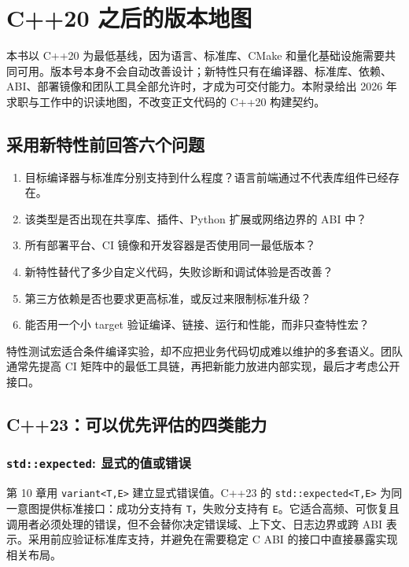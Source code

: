 \chapter{C++20 之后的版本地图}

本书以 C++20 为最低基线，因为语言、标准库、CMake 和量化基础设施需要共同可用。版本号本身不会自动改善设计；新特性只有在编译器、标准库、依赖、ABI、部署镜像和团队工具全部允许时，才成为可交付能力。本附录给出 2026 年求职与工作中的识读地图，不改变正文代码的 C++20 构建契约。

\section{采用新特性前回答六个问题}

\begin{enumerate}
  \item 目标编译器与标准库分别支持到什么程度？语言前端通过不代表库组件已经存在。
  \item 该类型是否出现在共享库、插件、Python 扩展或网络边界的 ABI 中？
  \item 所有部署平台、CI 镜像和开发容器是否使用同一最低版本？
  \item 新特性替代了多少自定义代码，失败诊断和调试体验是否改善？
  \item 第三方依赖是否也要求更高标准，或反过来限制标准升级？
  \item 能否用一个小 target 验证编译、链接、运行和性能，而非只查特性宏？
\end{enumerate}

特性测试宏适合条件编译实验，却不应把业务代码切成难以维护的多套语义。团队通常先提高 CI 矩阵中的最低工具链，再把新能力放进内部实现，最后才考虑公开接口。

\section{C++23：可以优先评估的四类能力}

\subsection{\texttt{std::expected}: 显式的值或错误}

第 10 章用 \texttt{variant<T,E>} 建立显式错误值。C++23 的 \texttt{std::expected<T,E>} 为同一意图提供标准接口：成功分支持有 \texttt{T}，失败分支持有 \texttt{E}。它适合高频、可恢复且调用者必须处理的错误，但不会替你决定错误域、上下文、日志边界或跨 ABI 表示。采用前应验证标准库支持，并避免在需要稳定 C ABI 的接口中直接暴露实现相关布局。

